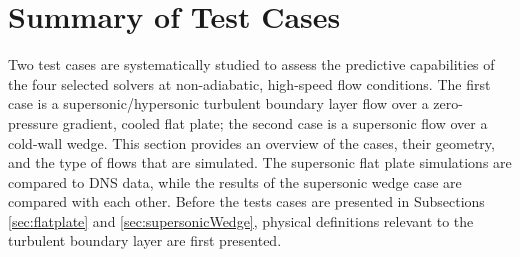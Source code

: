 \documentclass[journal ]{new-aiaa}
\begin{document}


\section{Summary of Test Cases}\label{sec:summary}
Two test cases are systematically studied to assess the predictive capabilities of the four selected solvers at non-adiabatic, high-speed flow conditions. The first case is a supersonic/hypersonic turbulent boundary layer flow over a zero-pressure gradient, cooled flat plate; the second case is a supersonic flow over a cold-wall wedge. This section provides an overview of the cases, their geometry, and the type of flows that are simulated. The supersonic flat plate simulations are compared to DNS data, while the results of the supersonic wedge case are compared with each other.  Before the tests cases are presented in Subsections \ref{sec:flatplate} and \ref{sec:supersonicWedge}, physical definitions relevant to the turbulent boundary layer are first presented.
\end{document}
